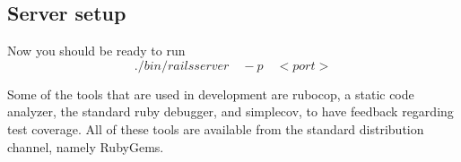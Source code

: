 \subsection{Server setup}
Now you should be ready to run
\[./bin/rails server \quad -p \quad  <port>\]

Some of the tools that are used in development are rubocop, a static code analyzer,
the standard ruby debugger, and simplecov, to have feedback regarding test coverage.
All of these tools are available from the standard distribution channel, namely RubyGems.


